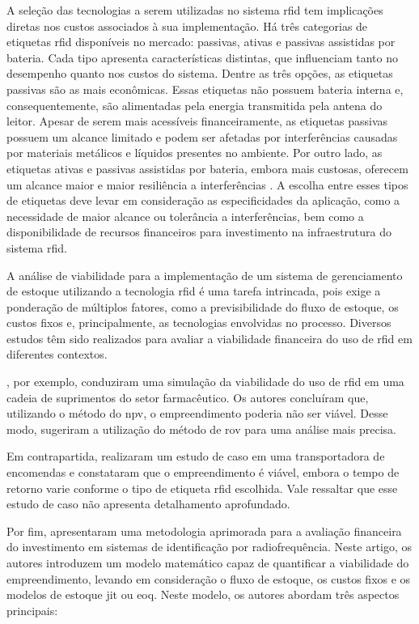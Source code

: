 A seleção das tecnologias a serem utilizadas no sistema \acrshort{rfid} tem implicações diretas nos custos associados à sua implementação. Há três categorias de etiquetas \acrshort{rfid} disponíveis no mercado: passivas, ativas e passivas assistidas por bateria. Cada tipo apresenta características distintas, que influenciam tanto no desempenho quanto nos custos do sistema. Dentre as três opções, as etiquetas passivas são as mais econômicas. Essas etiquetas não possuem bateria interna e, consequentemente, são alimentadas pela energia transmitida pela antena do leitor. Apesar de serem mais acessíveis financeiramente, as etiquetas passivas possuem um alcance limitado e podem ser afetadas por interferências causadas por materiais metálicos e líquidos presentes no ambiente. Por outro lado, as etiquetas ativas e passivas assistidas por bateria, embora mais custosas, oferecem um alcance maior e maior resiliência a interferências \cite{Lee2012}. A escolha entre esses tipos de etiquetas deve levar em consideração as especificidades da aplicação, como a necessidade de maior alcance ou tolerância a interferências, bem como a disponibilidade de recursos financeiros para investimento na infraestrutura do sistema \acrshort{rfid}.


A análise de viabilidade para a implementação de um sistema de gerenciamento de estoque utilizando a tecnologia \acrshort{rfid} é uma tarefa intrincada, pois exige a ponderação de múltiplos fatores, como a previsibilidade do fluxo de estoque, os custos fixos e, principalmente, as tecnologias envolvidas no processo. Diversos estudos têm sido realizados para avaliar a viabilidade financeira do uso de \acrshort{rfid} em diferentes contextos.

\textcite{Yue2011}, por exemplo, conduziram uma simulação da viabilidade do uso de \acrshort{rfid} em uma cadeia de suprimentos do setor farmacêutico. Os autores concluíram que, utilizando o método do \acrfull{npv}, o empreendimento poderia não ser viável. Desse modo, sugeriram a utilização do método de \acrfull{rov} para uma análise mais precisa.

Em contrapartida, \textcite{Ustundag2007} realizaram um estudo de caso em uma transportadora de encomendas e constataram que o empreendimento é viável, embora o tempo de retorno varie conforme o tipo de etiqueta \acrshort{rfid} escolhida. Vale ressaltar que esse estudo de caso não apresenta detalhamento aprofundado.

Por fim, \textcite{Lee2012} apresentaram uma metodologia aprimorada para a avaliação financeira do investimento em sistemas de identificação por radiofrequência. Neste artigo, os autores introduzem um modelo matemático capaz de quantificar a viabilidade do empreendimento, levando em consideração o fluxo de estoque, os custos fixos e os modelos de estoque \acrfull{jit} ou \acrfull{eoq}. Neste modelo, os autores abordam três aspectos principais: 

